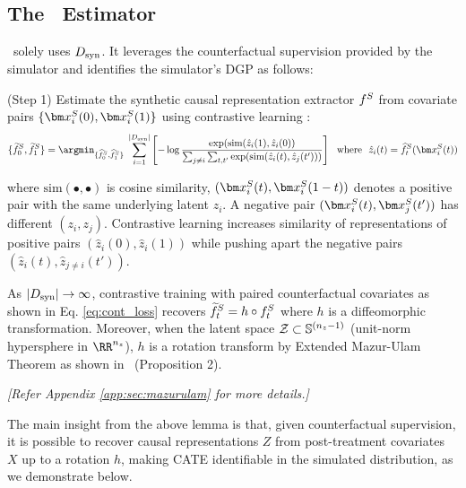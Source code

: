 
\subsection{The \simonly\ Estimator}
\simonly\ solely uses $D_{\text{syn}}$. It leverages the counterfactual supervision provided by the simulator and identifies the simulator's DGP as follows:

(Step 1) Estimate the synthetic causal representation extractor $f^S$ from covariate pairs $\{\xb_i^S(0), \xb_i^S(1)\}$ using contrastive learning \cite{von2021self}:
\begin{align}
    \{\SInvTilde_0, \SInvTilde_1\}  = \argmin_{\{\SInvhat_0, \SInvhat_1\}}\; \sum_{i=1}^{|\synD|}\left[- \log{\frac{\exp({\textrm{sim}(\hat{z}_i(1), \hat{z}_i(0)})}{\sum_{j \neq i}\sum_{t, t'} \exp({\textrm{sim}(\hat{z}_i(t), \hat{z}_j(t'))})}}\right]~~\text{where}~~\hat{z}_i(t) = \SInvhat_t(\xb^S_i(t))
    \label{eq:cont_loss}
\end{align}


where $\textrm{sim}(\bullet, \bullet)$ is cosine similarity, $(\xb^S_i(t), \xb^S_i(1-t))$ denotes a positive pair with the same underlying latent $z_i$. A negative pair $(\xb^S_i(t), \xb^S_j(t'))$ has different $(z_i, z_j)$. Contrastive learning increases similarity of representations of positive pairs $(\hat{z}_i(0), \hat{z}_i(1))$ while pushing apart the negative pairs $(\hat{z}_i(t), \hat{z}_{j \neq i}(t'))$.


\begin{lemma}
    As $|D_{\text{syn}}| \rightarrow \infty$, contrastive training with paired counterfactual covariates as shown in Eq. \ref{eq:cont_loss} recovers $\widetilde{f}^S_t = h \circ f^S_t$ where $h$ is a diffeomorphic transformation. Moreover, when the latent space $\mathcal{Z} \subset \mathbb{S}^{(n_z - 1)}$ (unit-norm hypersphere in $\RR^{n_z}$), $h$ is a rotation transform by Extended Mazur-Ulam Theorem as shown in~\citep{zimmermann2021cl} (Proposition 2).
    \label{app:lemma:cl_rotation}
\end{lemma}
\textit{[Refer Appendix \ref{app:sec:mazurulam} for more details.]} 

The main insight from the above lemma is that, given counterfactual supervision, it is possible to recover causal representations $Z$ from post-treatment covariates $X$ up to a rotation $h$, making CATE identifiable in the simulated distribution, as we demonstrate below. 

